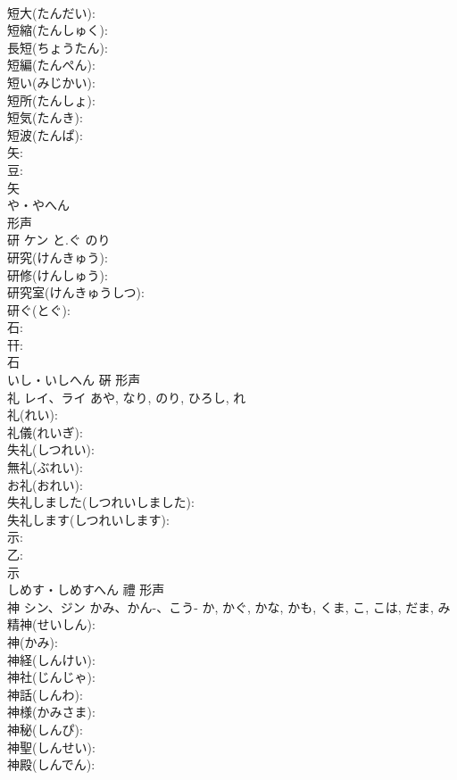 \documentclass[8pt]{extreport}
\begin{document}
\begin{CJK}{UTF8}{min}
\\	短大(たんだい): 
\\	短縮(たんしゅく): 
\\	長短(ちょうたん): 
\\	短編(たんぺん): 
\\	短い(みじかい): 
\\	短所(たんしょ): 
\\	短気(たんき): 
\\	短波(たんぱ): 
\\	矢: 
\\	豆: 
\\	矢	
\\	や・やへん	
\\	形声 
\\	研	ケン	と.ぐ	のり	
\\	研究(けんきゅう): 
\\	研修(けんしゅう): 
\\	研究室(けんきゅうしつ): 
\\	研ぐ(とぐ): 
\\	石: 
\\	幵: 
\\	石	
\\	いし・いしへん	硏	形声 
\\	礼	レイ、ライ		あや, なり, のり, ひろし, れ	
\\	礼(れい): 
\\	礼儀(れいぎ): 
\\	失礼(しつれい): 
\\	無礼(ぶれい): 
\\	お礼(おれい): 
\\	失礼しました(しつれいしました): 
\\	失礼します(しつれいします): 
\\	示: 
\\	乙: 
\\	示	
\\	しめす・しめすへん	禮	形声 
\\	神	シン、ジン	かみ、かん-、こう-	か, かぐ, かな, かも, くま, こ, こは, だま, み	
\\	精神(せいしん): 
\\	神(かみ): 
\\	神経(しんけい): 
\\	神社(じんじゃ): 
\\	神話(しんわ): 
\\	神様(かみさま): 
\\	神秘(しんぴ): 
\\	神聖(しんせい): 
\\	神殿(しんでん): 

\end{CJK}
\end{document}
